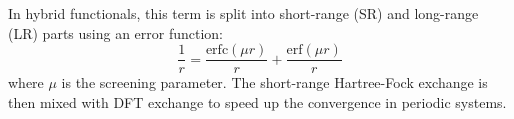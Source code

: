 In hybrid functionals, this term is split into short-range (SR) and long-range (LR) parts using an error function:
\begin{equation}
    \frac{1}{r} = \frac{\text{erfc}(\mu r)}{r} + \frac{\text{erf}(\mu r)}{r}
\end{equation}
where $\mu$ is the screening parameter. The short-range Hartree-Fock exchange is then mixed with DFT exchange to speed up the convergence in periodic systems.
